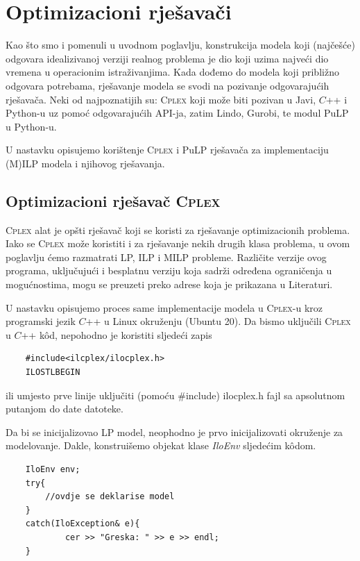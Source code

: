 \documentclass[b5paper, utf8, 11pt, colorlinks]{book}
\theoremstyle{definition}
\begin{document}
   \chapter{Optimizacioni rješavači}
 
  Kao što smo i pomenuli u uvodnom poglavlju, konstrukcija modela koji (najčešće) odgovara idealizivanoj verziji realnog problema je 
  dio koji uzima najveći dio vremena u operacionim istraživanjima. Kada dođemo do modela koji približno odgovara potrebama, rješavanje modela se svodi na pozivanje odgovarajućih rješavača. Neki od najpoznatijih su: 
  \textsc{Cplex} koji može biti pozivan u Javi, $C$++ i Python-u uz pomoć odgovarajućih API-ja, zatim Lindo, Gurobi, te modul PuLP u Python-u.
 
  U nastavku opisujemo korištenje \textsc{Cplex} i PuLP rješavača za implementaciju (M)ILP modela i njihovog rješavanja. 
 
  \section{Optimizacioni rješavač \textsc{Cplex}}
  \textsc{Cplex} alat je opšti rješavač   koji se koristi za rješavanje optimizacionih problema. Iako se \textsc{Cplex} može koristiti i za rješavanje nekih drugih klasa problema, u ovom poglavlju ćemo razmatrati  LP, ILP i MILP probleme.  Različite verzije ovog programa, uključujući i besplatnu verziju koja sadrži određena ograničenja u mogućnostima, mogu se preuzeti preko adrese koja je prikazana u Literaturi.
 
 
  U nastavku opisujemo proces same implementacije modela u \textsc{Cplex}-u kroz programski jezik $C$++ u Linux okruženju (Ubuntu 20).
  Da bismo uključili \textsc{Cplex} u $C$++ k\^od, nepohodno je koristiti sljedeći zapis
 \begin{verbatim}
 	#include<ilcplex/ilocplex.h>
 	ILOSTLBEGIN
 \end{verbatim}
ili umjesto prve linije uključiti (pomoću \#include) ilocplex.h fajl sa apsolutnom putanjom do date  datoteke. 

 Da bi se inicijalizovao LP model, neophodno je prvo inicijalizovati okruženje za modelovanje. Dakle, konstruišemo objekat klase \emph{IloEnv} sljedećim k\^odom.
 \begin{verbatim}
 	IloEnv env;
 	try{
 		//ovdje se deklarise model
 	}
 	catch(IloException& e){
 		    cer >> "Greska: " >> e >> endl;
 	}
 \end{verbatim}
 
\end{document}
